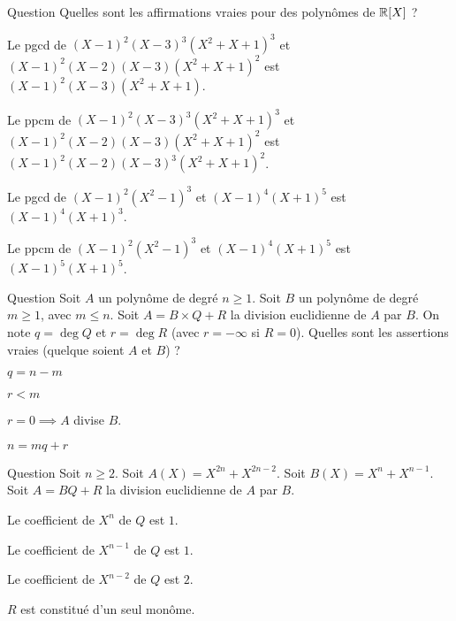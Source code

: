 \begin{multi}[multiple,feedback=
{Le pgcd s'obtient en prenant le minimum entre les exposants, le ppcm en prenant le maximum. Attention \(X^2-1=(X-1)(X+1)\).
}]{Question}
Quelles sont les affirmations vraies pour des polynômes de \(\mathbb{R}[X]\) ?

    \item Le pgcd de \((X-1)^2(X-3)^3(X^2+X+1)^3\) et
\((X-1)^2(X-2)(X-3)(X^2+X+1)^2\) est \((X-1)^2(X-3)(X^2+X+1)\).
    \item Le ppcm de \((X-1)^2(X-3)^3(X^2+X+1)^3\) et
\((X-1)^2(X-2)(X-3)(X^2+X+1)^2\) est \((X-1)^2(X-2)(X-3)^3(X^2+X+1)^2\).
    \item* Le pgcd de \((X-1)^2(X^2-1)^3\) et
\((X-1)^4(X+1)^5\) est \((X-1)^4(X+1)^3\).
    \item* Le ppcm de \((X-1)^2(X^2-1)^3\) et
\((X-1)^4(X+1)^5\) est \((X-1)^5(X+1)^5\).
\end{multi}


\begin{multi}[multiple,feedback=
{On a \(\deg R < \deg B\). Il ne faut pas confondre \(R=0\) et \(r=0\).
En plus \(\deg(A) = \deg(B\times Q) = \deg(A) + \deg(Q)\).
}]{Question}
Soit \(A\) un polynôme de degré \(n\ge1\). Soit \(B\) un polynôme de degré \(m\ge1\), avec \(m \le n\).
Soit \(A = B \times Q + R\) la division euclidienne de \(A\) par \(B\). On note
\(q = \deg Q\) et \(r = \deg R\) (avec \(r=-\infty\) si \(R=0\)).
Quelles sont les assertions vraies (quelque soient \(A\) et \(B\)) ?

    \item* \(q = n-m\)
    \item* \(r < m\)
    \item \(r=0 \implies A\) divise \(B\).
    \item \(n = mq + r\)
\end{multi}


\begin{multi}[multiple,feedback=
{\(Q(X) = X^n-X^{n-1}+2X^{n-2}-2X^{n-3}+\cdots\). \(R(X) = \pm 2 X^{n-1}\).
}]{Question}
Soit \(n\ge2\). Soit \(A(X) = X^{2n}+X^{2n-2}\). Soit \(B(X) = X^{n}+X^{n-1}\). Soit \(A = BQ + R\) la division euclidienne de \(A\) par \(B\).

    \item* Le coefficient de \(X^n\) de \(Q\) est \(1\).
    \item Le coefficient de \(X^{n-1}\) de \(Q\) est \(1\).
    \item* Le coefficient de \(X^{n-2}\) de \(Q\) est \(2\).
    \item* \(R\) est constitué d'un seul monôme.
\end{multi}


